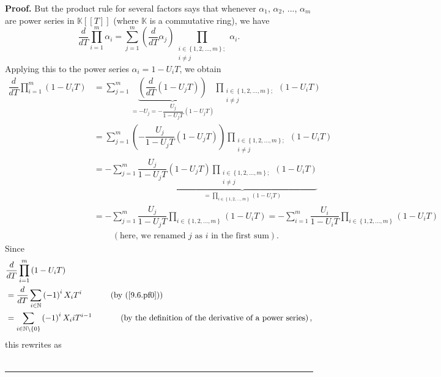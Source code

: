 \documentclass[numbers=enddot,12pt,final,onecolumn,notitlepage]{scrartcl}%
\newenvironment{proof}[1][Proof]{\noindent\textbf{#1.} }{\ \rule{0.5em}{0.5em}}
\begin{document}
\begin{proof}
But the product rule for several factors says that whenever $\alpha_{1}$,
$\alpha_{2}$, $...$, $\alpha_{m}$ are power series in $\mathbb{K}\left[
\left[  T\right]  \right]  $ (where $\mathbb{K}$ is a commutative ring), we
have%
\[
\dfrac{d}{dT}\prod\limits_{i=1}^{m}\alpha_{i}=\sum_{j=1}^{m}\left(  \dfrac
{d}{dT}\alpha_{j}\right)  \prod_{\substack{i\in\left\{  1,2,...,m\right\}
;\\i\neq j}}\alpha_{i}.
\]
Applying this to the power series $\alpha_{i}=1-U_{i}T$, we obtain%
\begin{align*}
\dfrac{d}{dT}\prod\limits_{i=1}^{m}\left(  1-U_{i}T\right)   &  =\sum
_{j=1}^{m}\underbrace{\left(  \dfrac{d}{dT}\left(  1-U_{j}T\right)  \right)
}_{=-U_{j}=-\dfrac{U_{j}}{1-U_{j}T}\left(  1-U_{j}T\right)  }\prod
_{\substack{i\in\left\{  1,2,...,m\right\}  ;\\i\neq j}}\left(  1-U_{i}%
T\right) \\
&  =\sum_{j=1}^{m}\left(  -\dfrac{U_{j}}{1-U_{j}T}\left(  1-U_{j}T\right)
\right)  \prod_{\substack{i\in\left\{  1,2,...,m\right\}  ;\\i\neq j}}\left(
1-U_{i}T\right) \\
&  =-\sum_{j=1}^{m}\dfrac{U_{j}}{1-U_{j}T}\underbrace{\left(  1-U_{j}T\right)
\prod_{\substack{i\in\left\{  1,2,...,m\right\}  ;\\i\neq j}}\left(
1-U_{i}T\right)  }_{=\prod\limits_{i\in\left\{  1,2,...,m\right\}  }\left(
1-U_{i}T\right)  }\\
&  =-\sum_{j=1}^{m}\dfrac{U_{j}}{1-U_{j}T}\prod\limits_{i\in\left\{
1,2,...,m\right\}  }\left(  1-U_{i}T\right)  =-\sum\limits_{i=1}^{m}%
\dfrac{U_{i}}{1-U_{i}T}\prod\limits_{i\in\left\{  1,2,...,m\right\}  }\left(
1-U_{i}T\right) \\
&  \ \ \ \ \ \ \ \ \ \ \left(  \text{here, we renamed }j\text{ as }i\text{ in
the first sum}\right)  .
\end{align*}
Since%
\begin{align*}
&  \dfrac{d}{dT}\prod\limits_{i=1}^{m}\left(  1-U_{i}T\right) \\
&  =\dfrac{d}{dT}\sum_{i\in\mathbb{N}}\left(  -1\right)  ^{i}X_{i}%
T^{i}\ \ \ \ \ \ \ \ \ \ \left(  \text{by (\ref{9.6.pf0})}\right) \\
&  =\sum_{i\in\mathbb{N}\setminus\left\{  0\right\}  }\left(  -1\right)
^{i}X_{i}iT^{i-1}\ \ \ \ \ \ \ \ \ \ \left(  \text{by the definition of the
derivative of a power series}\right)  ,
\end{align*}
this rewrites as%
\begin{equation}

\end{equation}
\end{proof}
\end{document}
